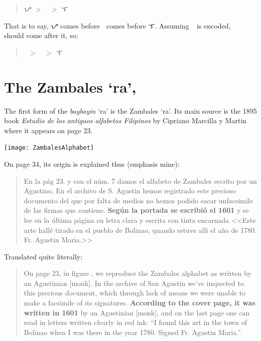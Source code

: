 \documentclass[a4paper,pagesize,openany,14pt,parskip=never]{scrbook}
\newcommand{\≈}{$\approx$}
\newcommand{\ra}{{\baybayin ᜍ}}
\begin{document}
\begin{quote}
    {\baybayin ᜌ} $>$ {\baybayin ᜍ} $>$ {\baybayin ᜎ}
\end{quote}

That is to say, {\baybayin ᜌ} comes before {\baybayin ᜍ} comes before {\baybayin ᜎ}. Assuming \ra\ is encoded, {\baybayinh ᜍ} should come after it, so:

\begin{quote}
    {\baybayin ᜍ} $>$ {\baybayinh ᜍ} $>$ {\baybayin ᜎ}
\end{quote}


\section{The Zambales `ra', {\baybayinh ᜍ}}
\label{Zambales}

The first form of the {\em baybayin} `ra' is the Zambales `ra'. Its main source is the 1895 book {\em Estudio de los antiguos alfabetos Filipinos} by Cipriano Marcilla y Martin where it appears on page 23. 

\texttt{[image: ZambalesAlphabet]}

On page 34, its origin is explained thus (emphasis mine):

\begin{quote}
    En la p\'ag 23. y con el n\'um. 7 damos el alfabeto de Zambales escrito por un Agustino. En el archivo de S. Agustin hemos registrado este precioso documento del que por falta de medios no hemos podido sacar unfacsimile de las firmas que contiene. {\bfseries Seg\'un la portada se escribi\'o el 1601} y se lee en la \'ultima p\'agina en letra clara y escrita con tinta encarnada <<Este arte hall\'e tirado en el pueblo de Bolinao, quando estuve all\'i el a\~no de 1780. Fr. Agustin Maria.>>
\end{quote}

Translated quite literally:

\begin{quote}
    On page 23, in figure , we reproduce the Zambales alphabet as written by an Agustinian [monk]. In the archive of San Agustin we've inspected to this precious document, which through lack of means we were unable to make a facsimile of its signatures. {\bfseries According to the cover page, it was written in 1601} by an Agustinian [monk], and on the last page one can read in letters written clearly in red ink: ``I found this art in the town of Bolinao when I was there in the year 1780. Signed Fr. Agustin Maria.''
\end{quote}
\end{document}
